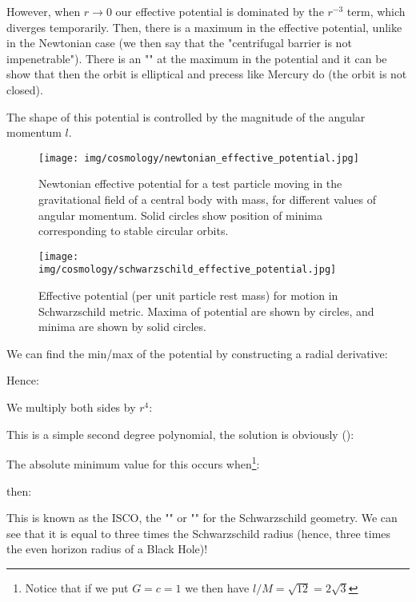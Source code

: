 	However, when $r\rightarrow 0$ our effective potential is dominated by the $r^{-3}$ term, which diverges temporarily. Then, there is a maximum in the effective potential, unlike in the Newtonian case (we then say that the "centrifugal barrier is not impenetrable"). There is an "" at the maximum in the potential and it can be show that then the orbit is elliptical and precess like Mercury do (the orbit is not closed).
	
	The shape of this potential is controlled by the magnitude of the angular momentum $l$.
	\begin{figure}[H]
		\centering
		\texttt{[image: img/cosmology/newtonian\_effective\_potential.jpg]}
		\captionsetup{width=0.7\linewidth}
		\caption[]{Newtonian effective potential for a test particle moving in the gravitational field of a central body with mass, for different values of angular momentum. Solid circles show position of minima corresponding to stable circular orbits.}
	\end{figure}
	\begin{figure}[H]
		\centering
		\texttt{[image: img/cosmology/schwarzschild\_effective\_potential.jpg]}
		\captionsetup{width=0.7\linewidth}
		\caption[]{Effective potential (per unit particle rest mass) for motion in Schwarzschild metric. Maxima of potential are shown by circles, and minima are shown by solid circles.}
	\end{figure}
	
	We can find the min/max of the potential by constructing a radial derivative:
	
	Hence:
	
	We multiply both sides by $r^4$:
	
	This is a simple second degree polynomial, the solution is obviously ():
	
	The absolute minimum value for this occurs when\footnote{Notice that if we put $G=c=1$ we then have $l/M=\sqrt{12}=2\sqrt{3}$}:
	
	then:
	
	This is known as the ISCO, the "" or "" for the Schwarzschild geometry. We can see that it is equal to three times the Schwarzschild radius (hence, three times the even horizon radius of a Black Hole)!
	
